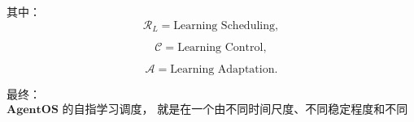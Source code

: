 其中：
\begin{equation}
\mathcal{R}_L
=
\text{Learning Scheduling},
\end{equation}

\begin{equation}
\mathcal{C}
=
\text{Learning Control},
\end{equation}

\begin{equation}
\mathcal{A}
=
\text{Learning Adaptation}.
\end{equation}

最终：
\begin{equation}
\boxed{
\textbf{
AgentOS 的自指学习调度，
就是在一个由不同时间尺度、不同稳定程度和不同结构修改权限组成的多层可塑性超图上，
对现实反馈所产生的信用进行受约束路由，
并允许这种路由策略依据其长期结果有限地修改自身。
}
}
\end{equation}